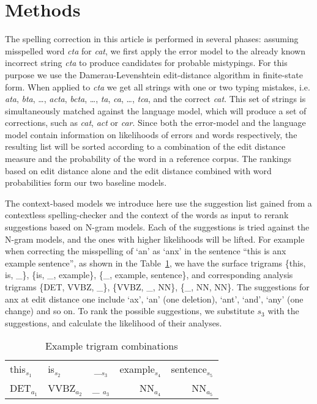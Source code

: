 \documentclass{llncs}
\begin{document}
\section{Methods}
\label{sec:methods}

The spelling correction in this article is performed in several phases:
assuming misspelled word \emph{cta} for \emph{cat}, we first apply the error
model to the already known incorrect string \emph{cta} to produce candidates
for probable mistypings. For this purpose we use the Damerau-Levenshtein
edit-distance algorithm in finite-state form. When applied to \emph{cta} we get
all strings with one or two typing mistakes, i.e. \emph{ata}, \emph{bta},
\ldots, \emph{acta}, \emph{bcta}, \ldots, \emph{ta}, \emph{ca}, \ldots,
\emph{tca}, and the correct \emph{cat}. This set of strings is simultaneously
matched against the language model, which will produce a set of corrections,
such as \emph{cat}, \emph{act} or \emph{car}. Since both the error-model and
the language model contain information on likelihoods of errors and words
respectively, the resulting list will be sorted according to a combination of
the edit distance measure and the probability of the word in a reference
corpus.  The rankings based on edit distance alone and the edit distance
combined with word probabilities form our two baseline models. 

The context-based models we introduce here use the suggestion list gained from
a contextless spelling-checker and the context of the words as input to rerank
suggestions based on N-gram models. Each of the suggestions is tried against
the N-gram models, and the ones with higher likelihoods will be lifted.  For
example when correcting the misspelling of `an' as `anx' in the sentence ``this
is anx example sentence'', as shown in the Table~\ref{fig:example}, we have the
surface trigrams \{this, is, \_\}, \{is, \_, example\}, \{\_, example,
sentence\}, and corresponding analysis trigrams \{DET, VVBZ, \_\}, \{VVBZ, \_,
NN\}, \{\_, NN, NN\}. The suggestions for anx at edit distance one include
`ax', `an' (one deletion), `ant', `and', `any' (one change) and so on. To rank
the possible suggestions, we substitute $s_3$ with the suggestions, and
calculate the likelihood of their analyses. 

\begin{table}
\caption{Example trigram combinations\label{fig:example}}
\begin{center}
\begin{tabular}{llcrr}
\hline
this$_{s_1}$ & is$_{s_2}$ & \_$_{s_3}$ & example$_{s_4}$ & sentence$_{s_5}$\\
DET$_{a_1}$ & VVBZ$_{a_2}$ & \_ $_{a_3}$& NN$_{a_4}$ & NN$_{a_5}$\\
\hline
\end{tabular}
\end{center}
\end{table}
\end{document}
